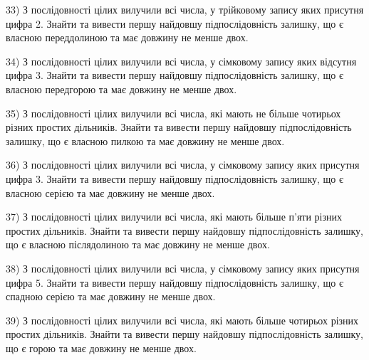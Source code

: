 \documentclass[11pt, ukrainian]{article}
\begin{document}
\par
\vspace{0.9cm}
33) \space 
З послідовності цілих вилучили всі числа, у трійковому запису яких присутня цифра 2. Знайти та вивести першу найдовшу підпослідовність залишку, що є власною переддолиною та має довжину не менше двох.

\par
\newpage
34) \space 
З послідовності цілих вилучили всі числа, у сімковому запису яких відсутня цифра 3. Знайти та вивести першу найдовшу підпослідовність залишку, що є власною передгорою та має довжину не менше двох.

\par
\vspace{0.9cm}
35) \space 
З послідовності цілих вилучили всі числа, які мають не більше чотирьох різних простих дільників. Знайти та вивести першу найдовшу підпослідовність залишку, що є власною пилкою та має довжину не менше двох.

\par
\vspace{0.9cm}
36) \space 
З послідовності цілих вилучили всі числа, у сімковому запису яких присутня цифра 3. Знайти та вивести першу найдовшу підпослідовність залишку, що є власною серією та має довжину не менше двох.

\par
\vspace{0.9cm}
37) \space 
З послідовності цілих вилучили всі числа, які мають більше п'яти різних простих дільників. Знайти та вивести першу найдовшу підпослідовність залишку, що є власною післядолиною та має довжину не менше двох.

\par
\vspace{0.9cm}
38) \space 
З послідовності цілих вилучили всі числа, у сімковому запису яких присутня цифра 5. Знайти та вивести першу найдовшу підпослідовність залишку, що є спадною серією та має довжину не менше двох.

\par
\vspace{0.9cm}
39) \space 
З послідовності цілих вилучили всі числа, які мають більше чотирьох різних простих дільників. Знайти та вивести першу найдовшу підпослідовність залишку, що є горою та має довжину не менше двох.
\end{document}
